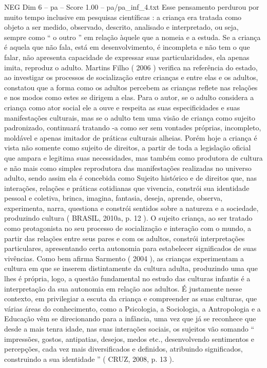 \begin{textsample}{NEG Dim 6 – pa – Score 1.00 – pa/pa\_inf\_4.txt}
Esse pensamento perdurou por muito tempo inclusive em pesquisas científicas : a criança era tratada como objeto a ser medido, observado, descrito, analisado e interpretado, ou seja, sempre como “ o outro ” em relação àquele que a nomeia e a estuda.
Se a criança é aquela que não fala, está em desenvolvimento, é incompleta e não tem o que falar, não apresenta capacidade de expressar suas particularidades, ela apenas imita, reproduz o adulto.
Martins Filho ( 2006 ) verifica na referência do estado, ao investigar os processos de socialização entre crianças e entre elas e os adultos, constatou que a forma como os adultos percebem as crianças reflete nas relações e nos modos como estes se dirigem a elas.
Para o autor, se o adulto considera a criança como ator social ele a ouve e respeita as suas especificidades e suas manifestações culturais, mas se o adulto tem uma visão de criança como sujeito padronizado, continuará tratando -a como ser sem vontades próprias, incompleto, moldável e apenas imitador de práticas culturais alheias.
Porém hoje a criança é vista não somente como sujeito de direitos, a partir de toda a legislação oficial que ampara e legitima suas necessidades, mas também como produtora de cultura e não mais como simples reprodutora das manifestações realizadas no universo adulto, sendo assim ela é concebida como Sujeito histórico e de direitos que, nas interações, relações e práticas cotidianas que vivencia, constrói sua identidade pessoal e coletiva, brinca, imagina, fantasia, deseja, aprende, observa, experimenta, narra, questiona e constrói sentidos sobre a natureza e a sociedade, produzindo cultura ( BRASIL, 2010a, p. 12 ).
O sujeito criança, ao ser tratado como protagonista no seu processo de socialização e interação com o mundo, a partir das relações entre seus pares e com os adultos, constrói interpretações particulares, apresentando certa autonomia para estabelecer significados de suas vivências.
Como bem afirma Sarmento ( 2004 ), as crianças experimentam a cultura em que se inserem distintamente da cultura adulta, produzindo uma que lhes é própria, logo, a questão fundamental no estudo das culturas infantis é a interpretação da sua autonomia em relação aos adultos.
É justamente nesse contexto, em privilegiar a escuta da criança e compreender as suas culturas, que várias áreas do conhecimento, como a Psicologia, a Sociologia, a Antropologia e a Educação vêm se direcionando para a infância, uma vez que já se reconhece que desde a mais tenra idade, nas suas interações sociais, os sujeitos vão somando “ impressões, gostos, antipatias, desejos, medos etc., desenvolvendo sentimentos e percepções, cada vez mais diversificados e definidos, atribuindo significados, construindo a sua identidade ” ( CRUZ, 2008, p. 13 ).

\end{textsample}
